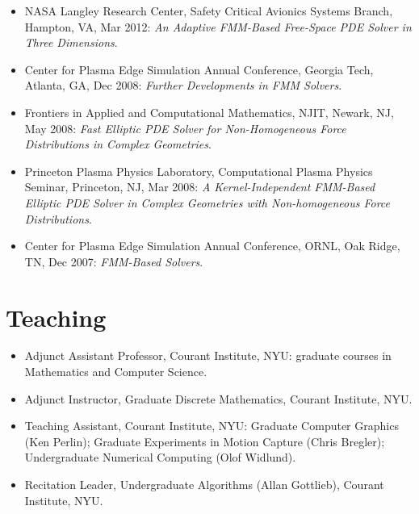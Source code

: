 \documentclass[10pt,letterpaper]{article}
\begin{document}
{\begin{itemize}
  \item NASA Langley Research Center, Safety Critical Avionics Systems Branch, Hampton, VA, Mar 2012: \textit{An Adaptive FMM-Based Free-Space PDE Solver in Three Dimensions}.
  \item Center for Plasma Edge Simulation Annual Conference, Georgia Tech, Atlanta, GA, Dec 2008: \textit{Further Developments in FMM Solvers}.
  \item Frontiers in Applied and Computational Mathematics, NJIT, Newark, NJ, May 2008: \textit{Fast Elliptic PDE Solver for Non-Homogeneous Force Distributions in Complex Geometries}.
  \item Princeton Plasma Physics Laboratory, Computational Plasma Physics Seminar, Princeton, NJ, Mar 2008: \textit{A Kernel-Independent FMM-Based Elliptic PDE Solver in Complex Geometries with Non-homogeneous Force Distributions}.
  \item Center for Plasma Edge Simulation Annual Conference, ORNL, Oak Ridge, TN, Dec 2007: \textit{FMM-Based Solvers}.
\end{itemize}

\section{Teaching}
\begin{itemize}
  \item Adjunct Assistant Professor, Courant Institute, NYU: graduate courses in Mathematics and Computer Science.
  \item Adjunct Instructor, Graduate Discrete Mathematics, Courant Institute, NYU.
  \item Teaching Assistant, Courant Institute, NYU: Graduate Computer Graphics (Ken Perlin); Graduate Experiments
        in Motion Capture (Chris Bregler); Undergraduate Numerical Computing (Olof Widlund).
  \item Recitation Leader, Undergraduate Algorithms (Allan Gottlieb), Courant Institute, NYU.
\end{itemize}

}
\end{document}
